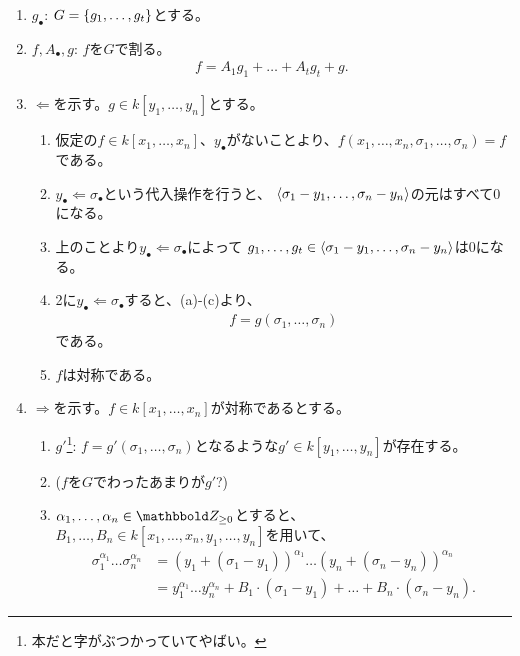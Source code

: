 \begin{myproof}
  \begin{enumerate}
    \item $g_\bullet$:
    $G=\left\{g_1,\dots,g_t\right\}$とする。
    \item
    $f,A_\bullet,g$:
    $f$を$G$で割る。
    \begin{align}
      f = A_1 g_1 + \dots + A_t g_t + g.
    \end{align}
    \item
    $\Leftarrow$を示す。$g\in k[y_1,\dots,y_n]$とする。
    \begin{enumerate}
      \item 仮定の$f\in k[x_1,\dots,x_n]$、$y_\bullet$がないことより、$f(x_1,\dots,x_n,\sigma_1,\dots,\sigma_n) = f$である。
      \item
      $y_\bullet \Leftarrow \sigma_\bullet$という代入操作を行うと、
      $\left\langle \sigma_1-y_1,\dots,\sigma_n-y_n \right\rangle$の元はすべて0になる。
      \item 上のことより$y_\bullet \Leftarrow \sigma_\bullet$によって
      $g_1,\dots,g_t \in \left\langle \sigma_1-y_1,\dots,\sigma_n-y_n \right\rangle$は0になる。
      \item
      2に$y_\bullet \Leftarrow \sigma_\bullet$すると、(a)-(c)より、
      \begin{align}
        f=g(\sigma_1,\dots,\sigma_n)
      \end{align}
      である。
      \item $f$は対称である。
    \end{enumerate}
    \item $\Rightarrow$を示す。$f\in k[x_1,\dots,x_n]$が対称であるとする。
    \begin{enumerate}
      \item $g'$\footnote{本だと字がぶつかっていてやばい。}:
      $f=g'(\sigma_1,\dots,\sigma_n)$となるような$g'\in k[y_1,\dots,y_n]$が存在する。
      \item ($f$を$G$でわったあまりが$g'$?)
      \item
      $\alpha_1,\dots,\alpha_n \in \Zge$とすると、
      $B_1,\dots,B_n \in k[x_1,\dots,x_n,y_1,\dots,y_n]$を用いて、
      \begin{align}
        \sigma_1^{\alpha_1}\dots \sigma_n^{\alpha_n}
        &=
        (y_1+(\sigma_1-y_1))^{\alpha_1} \dots (y_n + (\sigma_n-y_n))^{\alpha_n}\\
        &=
        y_1^{\alpha_1}\dots y_n^{\alpha_n} + B_1\cdot (\sigma_1-y_1)  + \dots + B_n\cdot (\sigma_n-y_n).
      \end{align}

\end{enumerate}
\end{enumerate}
\end{myproof}

